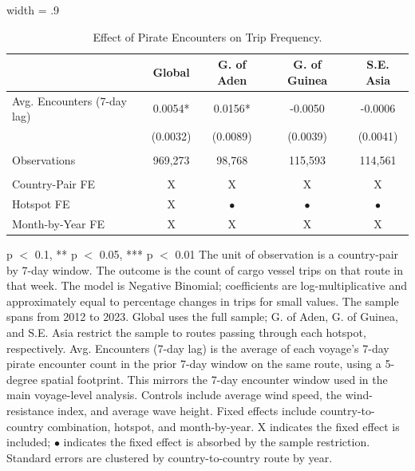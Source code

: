\begin{table}

\caption{Effect of Pirate Encounters on Trip Frequency. \label{tab:trip-count-rev2}}
\centering
\begin{adjustbox}{width = .9\textwidth}
\begin{threeparttable}
\begin{tabular}[t]{lcccc}
\toprule
  & Global & G. of Aden & G. of Guinea & S.E. Asia\\
\midrule
Avg. Encounters (7-day lag) & 0.0054* & 0.0156* & -0.0050 & -0.0006\\
 & (0.0032) & (0.0089) & (0.0039) & (0.0041)\\
 &  &  &  & \\
Observations & 969,273 & 98,768 & 115,593 & 114,561\\
 &  &  &  & \\
Country-Pair FE & X & X & X & X\\
Hotspot FE & X & $\bullet$ & $\bullet$ & $\bullet$\\
Month-by-Year FE & X & X & X & X\\
\bottomrule
\end{tabular}
\begin{tablenotes}
\item \scriptsize * p $<$ 0.1, ** p $<$ 0.05, *** p $<$ 0.01 The unit of observation is a country-pair by 7-day window. The outcome is the count of cargo vessel trips on that route in that week. The model is Negative Binomial; coefficients are log-multiplicative and approximately equal to percentage changes in trips for small values. The sample spans from 2012 to 2023. Global uses the full sample; G. of Aden, G. of Guinea, and S.E. Asia restrict the sample to routes passing through each hotspot, respectively. Avg. Encounters (7-day lag) is the average of each voyage's 7-day pirate encounter count in the prior 7-day window on the same route, using a 5-degree spatial footprint. This mirrors the 7-day encounter window used in the main voyage-level analysis. Controls include average wind speed, the wind-resistance index, and average wave height. Fixed effects include country-to-country combination, hotspot, and month-by-year. X indicates the fixed effect is included; $\bullet$ indicates the fixed effect is absorbed by the sample restriction. Standard errors are clustered by country-to-country route by year.
\end{tablenotes}
\end{threeparttable}
\end{adjustbox}
\end{table}
